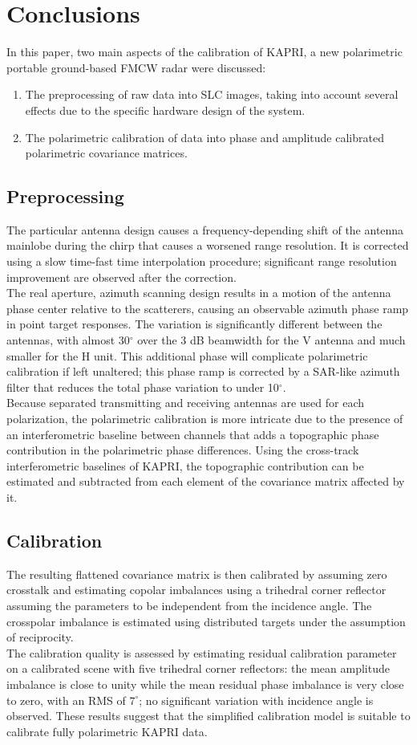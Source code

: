 \section{Conclusions}\label{sec:conclusions}
In this paper, two main aspects of the calibration of KAPRI, a new polarimetric portable ground-based FMCW radar were discussed:
\begin{enumerate}
	\item The preprocessing of raw data into SLC images, taking into account several effects due to the specific hardware design of the system.
	\item The polarimetric calibration of data into phase and amplitude calibrated polarimetric covariance matrices.
\end{enumerate}
\subsection{Preprocessing}
 The particular antenna design causes a frequency-depending shift of the antenna mainlobe during the chirp that causes a worsened range resolution. It is corrected using a slow time-fast time interpolation procedure; significant range resolution improvement are observed after the correction.\\ The real aperture, azimuth scanning design results in a motion of the antenna phase center relative to the scatterers, causing an observable azimuth phase ramp in point target responses. The variation is significantly different between the antennas, with almost 30$^\circ$ over the 3 dB beamwidth for the V antenna and much smaller for the H unit. This additional phase will complicate polarimetric calibration if left unaltered; this phase ramp is corrected by a SAR-like azimuth filter that reduces the total phase variation to under 10$^\circ$.\\
Because separated transmitting and receiving antennas are used for each polarization, the polarimetric calibration is more intricate due to the presence of an interferometric baseline between channels that adds a topographic phase contribution in the polarimetric phase differences. Using the cross-track interferometric baselines of KAPRI, the topographic contribution can be estimated and subtracted from each element of the covariance matrix affected by it.
\subsection{Calibration}
The resulting flattened covariance matrix is then calibrated  by assuming zero crosstalk and estimating copolar imbalances using a trihedral corner reflector assuming the parameters to be independent from the  incidence angle. The crosspolar imbalance is estimated using distributed targets under the assumption of reciprocity.\\
The calibration quality is assessed by estimating residual calibration parameter on a calibrated scene with five trihedral corner reflectors: the mean amplitude imbalance is close to unity while the mean residual phase imbalance is very close to zero, with an RMS of $7^\circ$; no significant variation with incidence angle is observed. These results suggest that the simplified calibration model\cite{Fore2015,Sarabandi1990} is suitable to calibrate fully polarimetric KAPRI data.